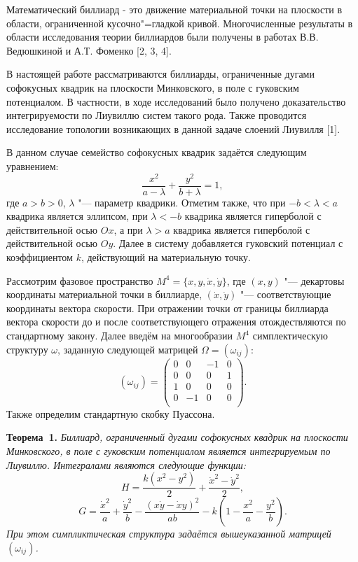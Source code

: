 \vzmscaption

Математический биллиард - это движение материальной точки на плоскости в области, ограниченной кусочно"=гладкой кривой. Многочисленные результаты в области исследования теории биллиардов были получены в работах В.В. Ведюшкиной и А.Т. Фоменко [2, 3, 4].

В настоящей работе рассматриваются биллиарды, ограниченные дугами софокусных квадрик на плоскости Минковского, в поле с гуковским потенциалом. В частности, в ходе исследований было получено доказательство интегрируемости по Лиувиллю систем такого рода. Также проводится исследование топологии возникающих в данной задаче слоений Лиувилля [1].

В данном случае семейство софокусных квадрик задаётся следующим уравнением:
$$\frac{x^2}{a-\lambda}+\frac{y^2}{b+\lambda}=1,$$
где $a>b>0$, $\lambda$ "--- параметр квадрики. Отметим также, что при $-b<\lambda<a$ квадрика является эллипсом, при $\lambda<-b$ квадрика является гиперболой с действительной осью $Ox$, а при $\lambda>a$ квадрика является гиперболой с действительной осью $Oy$. Далее в систему добавляется гуковский потенциал с коэффициентом $k$, действующий на материальную точку.

Рассмотрим фазовое пространство $M^4=\{x, y, \dot{x}, \dot{y}\}$, где $(x, y)$ "--- декартовы координаты материальной точки в биллиарде, $(\dot{x}, \dot{y})$ "--- соответствующие координаты вектора скорости. При отражении точки от границы биллиарда вектора скорости до и после соответствующего отражения отождествляются по стандартному закону. Далее введём на многообразии $M^4$ симплектическую структуру $\omega$, заданную следующей матрицей $\Omega=(\omega_{ij})$:
$$(\omega_{ij})=\left(\begin{array}{cccc}
0 & 0 & -1 & 0 \\
0 & 0 & 0 & 1 \\
1 & 0 & 0 & 0 \\
0 & -1 & 0 & 0 \\
\end{array}\right)
.$$
Также определим стандартную скобку Пуассона.

\textbf{Теорема~1.} {\it Биллиард, ограниченный дугами софокусных квадрик на плоскости Минковского, в поле с гуковским потенциалом является интегрируемым по Лиувиллю. Интегралами являются следующие функции:
$$H=\frac{k(x^2-y^2)}{2}+\frac{{\dot{x}}^2-{\dot{y}}^2}{2},$$
$$G=\frac{{\dot{x}}^2}{a}+\frac{{\dot{y}}^2}{b}-\frac{{(x\dot{y}-\dot{x}y)}^2}{ab}-k(1-\frac{x^2}{a}-\frac{y^2}{b}).$$ При этом симпликтическая структура задаётся вышеуказанной матрицей $(\omega_{ij})$.}


